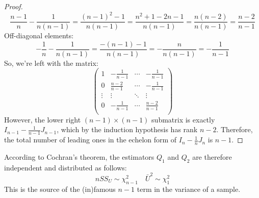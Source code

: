 \documentclass[12pt, a4paper]{article}
\begin{document}
\begin{proof}
\begin{equation}
\frac{n-1}{n}-\frac{1}{n(n-1)}=\frac{(n-1)^2-1}{n(n-1)}=\frac{n^2+1-2n-1}{n(n-1)}=\frac{n(n-2)}{n(n-1)}=\frac{n-2}{n-1}
\end{equation}
Off-diagonal elements:
\begin{equation}
-\frac{1}{n}-\frac{1}{n(n-1)}=\frac{-(n-1)-1}{n(n-1)}=-\frac{n}{n(n-1)}=-\frac{1}{n-1}
\end{equation}
So, we're left with the matrix:
\begin{equation}
\begin{pmatrix}
	 1				& -\frac{1}{n-1}& \cdots	& -\frac{1}{n-1} \\
	 0				& \frac{n-2}{n-1}& \cdots	& -\frac{1}{n-1} \\
	 \vdots			& \vdots		& \ddots	& \vdots \\
	 0				& -\frac{1}{n-1}& \cdots	& \frac{n-2}{n-1} \\
\end{pmatrix}
\end{equation}
However, the lower right $(n-1)\times(n-1)$ submatrix is exactly $I_{n-1}-\frac{1}{n-1}J_{n-1}$, which by the induction hypothesis has rank $n-2$. Therefore, the total number of leading ones in the echelon form of $I_n-\frac{1}{n}J_n$ is $n-1$.
\end{proof}
According to Cochran's theorem, the estimators $Q_1$ and $Q_2$ are therefore independent and distributed as follows:
\begin{equation}
\label{sn_dist}
n SS_U\sim\chi^2_{n-1}\quad\bar{U}^2\sim\chi^2_1
\end{equation}
This is the source of the (in)famous $n-1$ term in the variance of a sample.
\end{document}
